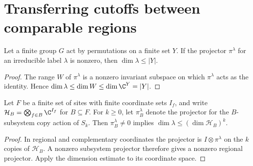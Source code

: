 \section{Transferring cutoffs between comparable regions}

\begin{theorem}
    \label{thm:occurring_label_dimension}
    \leanok
    Let a finite group $G$ act by permutations on a finite set $Y$.
    If the projector $\pi^\lambda$ for an irreducible label $\lambda$
    is nonzero, then $\dim\lambda\leq |Y|$.
\end{theorem}
\begin{proof}\leanok
    The range $W$ of $\pi^\lambda$ is a nonzero invariant subspace on
    which $\pi^\lambda$ acts as the identity. Hence
    $\dim\lambda\leq\dim W\leq\dim\C^Y=|Y|$.
\end{proof}

\begin{theorem}
    \label{thm:occurring_subsystem_label_dimension}
    \leanok
    Let $F$ be a finite set of sites with finite coordinate sets $I_f$,
    and write $\mathcal H_B=\bigotimes_{f\in B}\C^{I_f}$ for $B\subseteq F$.
    For $k\geq0$, let $\pi_B^\lambda$ denote the projector for the
    $B$-subsystem copy action of $S_k$. Then
    $\pi_B^\lambda\ne0$ implies $\dim\lambda\leq(\dim\mathcal H_B)^k$.
\end{theorem}
\begin{proof}\leanok
    In regional and complementary coordinates the projector is
    $I\otimes\pi^\lambda$ on the $k$ copies of $\mathcal H_B$.
    A nonzero subsystem projector therefore gives a nonzero regional
    projector. Apply the dimension estimate to its coordinate space.
\end{proof}

